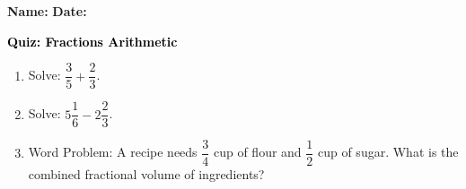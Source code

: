 \documentclass[12pt, letterpaper, fleqn]{article}
\begin{document}
\textbf{Name:} \underline{\hspace{5cm}}
\hfill
\textbf{Date:} \underline{\hspace{3cm}}\\

\begin{tcolorbox}[colback=customteal!20]
    \large\textcolor{black}{\textbf{Quiz: Fractions Arithmetic}}
\end{tcolorbox}
\begin{enumerate}[itemsep=3.5cm, leftmargin=0.6cm]
\item Solve: $\dfrac{3}{5} + \dfrac{2}{3}$.
\vspace{3.5cm}
\item Solve: $5\dfrac{1}{6} - 2\dfrac{2}{3}$.
\vspace{3.5cm}
\item Word Problem: A recipe needs $\dfrac{3}{4}$ cup of flour and $\dfrac{1}{2}$ cup of sugar. What is the combined fractional volume of ingredients?
\end{enumerate}
\end{document}
